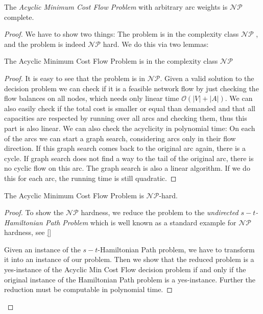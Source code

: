 \begin{theorem}
 The \textit{Acyclic Minimum Cost Flow Problem} with arbitrary arc weights is $\mathcal{NP}$ complete.
\end{theorem}
\begin{proof}
 We have to show two things: The problem is in the complexity class $\mathcal{NP}$ , and the problem is indeed 
$\mathcal{NP}$ hard. We do this via two lemmas:
\begin{lemma}
 The Acyclic Minimum Cost Flow Problem is in the complexity class $\mathcal{NP}$
\end{lemma}
\begin{proof}
It is easy to see that the problem is in $\mathcal{NP}$. Given a valid solution to the decision problem we can check if 
it is a feasible network flow by just checking the flow balances on all nodes, which needs only linear time 
$\mathcal{O}(|V|+|A|)$. We can also easily check if the total cost is smaller or equal than demanded and that all 
capacities are respected by running over all arcs and checking them, thus this part is also linear.
We can also check the acyclicity in polynomial time: On each of the arcs we can start a graph search, considering arcs 
only in their flow direction. If this graph search comes back to the original arc again, there is a cycle. %
If graph search does not find a way to the tail of the original arc, there is no cyclic flow on this arc. The graph 
search is also a linear algorithm. If we do this for each arc, the running time is still quadratic.
\end{proof}

\begin{lemma}
 The Acyclic Minimum Cost Flow Problem is $\mathcal{NP}$-hard.
\end{lemma}
\begin{proof}

To show the $\mathcal{NP}$ hardness, we reduce the problem to the \textit{undirected $s-t$-Hamiltonian Path Problem} 
which is well known as a standard example for $\mathcal{NP}$ hardness, see \ref{} 

Given an instance of the $s-t$-Hamiltonian Path problem, we have to transform it into an instance of our problem. Then 
we show that the reduced problem is a yes-instance of the Acyclic Min Cost Flow decision problem if and only if the 
original instance of the Hamiltonian Path problem is a yes-instance. Further the reduction must be computable in 
polynomial time.
 

\end{proof}
\end{proof}
